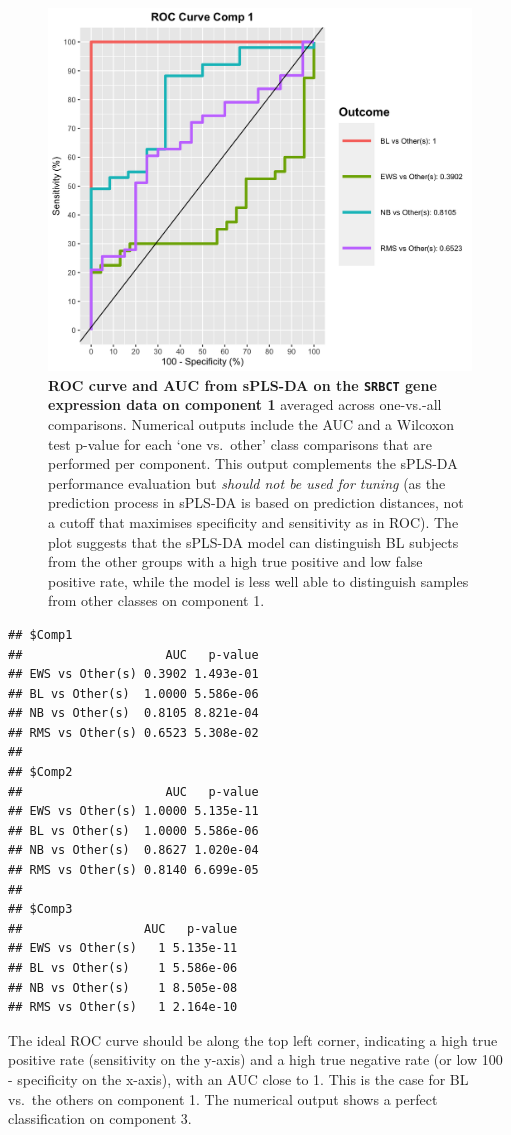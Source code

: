 \documentclass[]{book}
\begin{document}
\begin{figure}

{\centering \includegraphics[width=0.5\linewidth]{Figures/PLSDA/splsda-roc-1} 

}

\caption{\textbf{ROC curve and AUC from sPLS-DA on the \texttt{SRBCT} gene expression data on component 1} averaged across one-vs.-all comparisons. Numerical outputs include the AUC and a Wilcoxon test p-value for each `one vs.~other' class comparisons that are performed per component. This output complements the sPLS-DA performance evaluation but \emph{should not be used for tuning} (as the prediction process in sPLS-DA is based on prediction distances, not a cutoff that maximises specificity and sensitivity as in ROC). The plot suggests that the sPLS-DA model can distinguish BL subjects from the other groups with a high true positive and low false positive rate, while the model is less well able to distinguish samples from other classes on component 1.}\label{fig:splsda-roc}
\end{figure}

\begin{verbatim}
## $Comp1
##                    AUC   p-value
## EWS vs Other(s) 0.3902 1.493e-01
## BL vs Other(s)  1.0000 5.586e-06
## NB vs Other(s)  0.8105 8.821e-04
## RMS vs Other(s) 0.6523 5.308e-02
## 
## $Comp2
##                    AUC   p-value
## EWS vs Other(s) 1.0000 5.135e-11
## BL vs Other(s)  1.0000 5.586e-06
## NB vs Other(s)  0.8627 1.020e-04
## RMS vs Other(s) 0.8140 6.699e-05
## 
## $Comp3
##                 AUC   p-value
## EWS vs Other(s)   1 5.135e-11
## BL vs Other(s)    1 5.586e-06
## NB vs Other(s)    1 8.505e-08
## RMS vs Other(s)   1 2.164e-10
\end{verbatim}



The ideal ROC curve should be along the top left corner, indicating a high true positive rate (sensitivity on the y-axis) and a high true negative rate (or low 100 - specificity on the x-axis), with an AUC close to 1. This is the case for BL vs.~the others on component 1. The numerical output shows a perfect classification on component 3.
\end{document}
